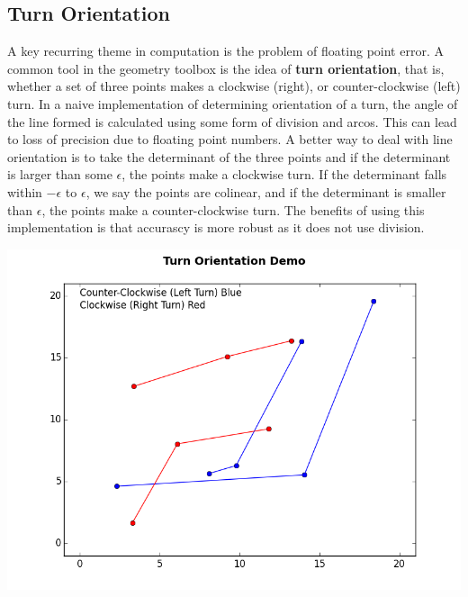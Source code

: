 \documentclass[12pt]{article}
\begin{document}
\begin{multicols}{2}
\subsection{Turn Orientation}

\indent A key recurring theme in computation is the problem of floating point error. A common tool in the geometry toolbox is the idea of \textbf{turn orientation}, that is, whether a set of three points makes a clockwise (right), or counter-clockwise (left) turn. In a naive implementation of determining orientation of a turn, the angle of the line formed is calculated using some form of division and arcos. This can lead to loss of precision due to floating point numbers. \newline
\indent A better way to deal with line orientation is to take the determinant of the three points and if the determinant is larger than some $\epsilon$, the points make a clockwise turn. If the determinant falls within $-\epsilon$ to $\epsilon$, we say the points are colinear, and if the determinant is smaller than $\epsilon$, the points make a counter-clockwise turn. The benefits of using this implementation is that accurascy is more robust as it does not use division. \newline \\
\centerline{\includegraphics[scale=.4]{turn_orientation.png}}


\end{multicols}
\end{document}
